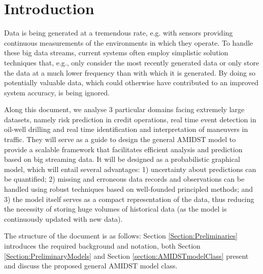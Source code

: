 \section{Introduction}


Data is being generated at a tremendous rate, e.g. with sensors providing continuous measurements of the environments in which they operate. To handle these big data streams, current systems often employ simplistic solution techniques that, e.g., only consider the most recently generated data or only store the data at a much lower frequency than with which it is generated. By doing so potentially valuable data, which could otherwise have contributed to an improved system accuracy, is being ignored. 

Along this document, we analyse 3 particular domains facing extremely large datasets, namely risk prediction in credit operations, real time event detection in oil-well drilling and real time identification and interpretation of maneuvers in traffic. They will serve as a guide to design the general AMIDST model to provide a scalable framework that facilitates efficient analysis and prediction based on big streaming data. It will be designed as a probabilistic graphical model, which will entail several advantages: 1) uncertainty about predictions can be quantified; 2) missing and erroneous data records and observations can be handled using robust techniques based on well-founded principled methods; and 3) the model itself serves as a compact representation of the data, thus reducing the necessity of storing huge volumes of historical data (as the model is continuously updated with new data).


The structure of the document is as follows: Section \ref{Section:Preliminaries} introduces the required background and notation, both Section \ref{Section:PreliminaryModels} and Section \ref{section:AMIDSTmodelClass} present and discuss the proposed general AMIDST model class.